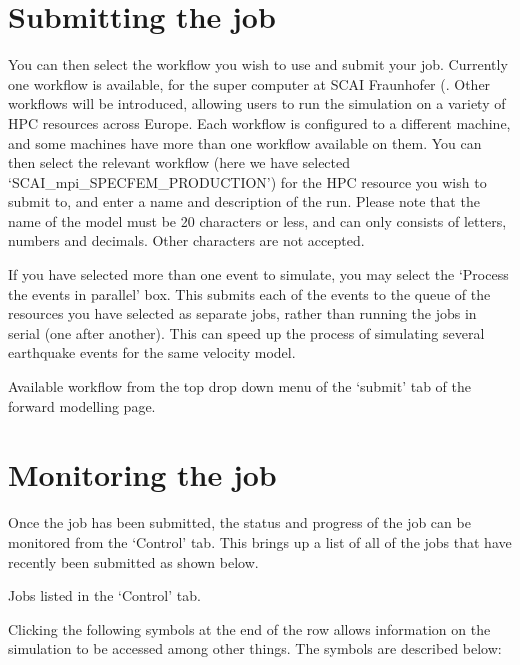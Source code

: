 \documentclass[english]{book}
\begin{document}
\section{Submitting the job}
\label{\detokenize{Section5:submitting-the-job}}
You can then select the workflow you wish to use and submit your job.
Currently one workflow is available, for the super computer at SCAI
Fraunhofer
(. Other
workflows will be introduced, allowing users to run the simulation on a
variety of HPC resources across Europe. Each workflow is configured to a
different machine, and some machines have more than one workflow
available on them. You can then select the relevant workflow (here we
have selected ‘SCAI\_mpi\_SPECFEM\_PRODUCTION’) for the HPC resource you
wish to submit to, and enter a name and description of the run. Please
note that the name of the model must be 20 characters or less, and can
only consists of letters, numbers and decimals. Other characters are not
accepted.

If you have selected more than one event to simulate, you may select the
‘Process the events in parallel’ box. This submits each of the events to
the queue of the resources you have selected as separate jobs, rather
than running the jobs in serial (one after another). This can speed up
the process of simulating several earthquake events for the same
velocity model.


 Available workflow from the top drop down menu of the
‘submit’ tab of the forward modelling page.


\section{Monitoring the job}
\label{\detokenize{Section5:monitoring-the-job}}
Once the job has been submitted, the status and progress of the job can
be monitored from the ‘Control’ tab. This brings up a list of all of the
jobs that have recently been submitted as shown below.


 Jobs listed in the ‘Control’ tab.

Clicking the following symbols at the end of the row allows information
on the simulation to be accessed among other things. The symbols are
described below:
\end{document}
